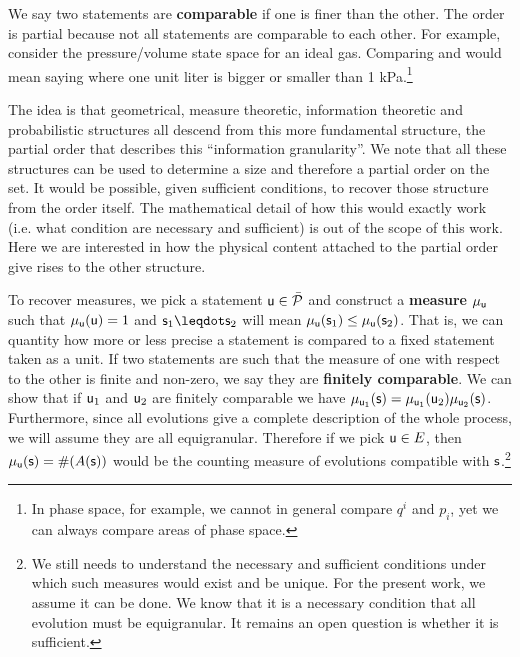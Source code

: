 \documentclass[letterpaper]{article}
\begin{document}
We say two statements are \textbf{comparable} if one is finer than the other. The order is partial because not all statements are comparable to each other. For example, consider the pressure/volume state space for an ideal gas. Comparing  and  would mean saying where one unit liter is bigger or smaller than 1 kPa.\footnote{In phase space, for example, we cannot in general compare $q^i$ and $p_i$, yet we can always compare areas of phase space.}

The idea is that geometrical, measure theoretic, information theoretic and probabilistic structures all descend from this more fundamental structure, the partial order that describes this ``information granularity''. We note that all these structures can be used to determine a size and therefore a partial order on the set. It would be possible, given sufficient conditions, to recover those structure from the order itself. The mathematical detail of how this would exactly work (i.e. what condition are necessary and sufficient) is out of the scope of this work. Here we are interested in how the physical content attached to the partial order give rises to the other structure.

To recover measures, we pick a statement $\stmt[u] \in \tdomain[P]$ and construct a \textbf{measure} $\mu_{\stmt[u]}$ such that $\mu_{\stmt[u]}(\stmt[u]) = 1$ and $\stmt_1 \finer \stmt_2$ will mean $\mu_{\stmt[u]}(\stmt_1) \leq \mu_{\stmt[u]}(\stmt_2)$. That is, we can quantity how more or less precise a statement is compared to a fixed statement taken as a unit. If two statements are such that the measure of one with respect to the other is finite and non-zero, we say they are \textbf{finitely comparable}. We can show that if $\stmt[u]_1$ and $\stmt[u]_2$ are finitely comparable we have $ \mu_{\stmt[u]_1}(\stmt) = \mu_{\stmt[u]_1}(\stmt[u]_2) \mu_{\stmt[u]_2}(\stmt)$. Furthermore, since all evolutions give a complete description of the whole process, we will assume they are all equigranular. Therefore if we pick $\stmt[u] \in E$, then $\mu_{\stmt[u]}(\stmt)=\#(A(\stmt))$ would be the counting measure of evolutions compatible with $\stmt$.\footnote{We still needs to understand the necessary and sufficient conditions under which such measures would exist and be unique. For the present work, we assume it can be done. We know that it is a necessary condition that all evolution must be equigranular. It remains an open question is whether it is sufficient.}
\end{document}
